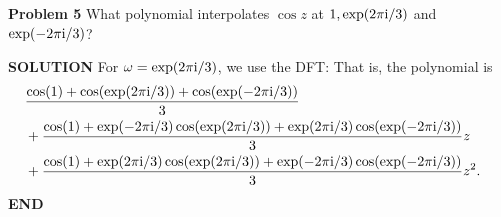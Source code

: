 \documentclass[12pt,a4paper]{article}
\begin{document}
\textbf{Problem 5} What polynomial interpolates $\cos z$ at $1, \exp(2\pi{\rm i}/3)$ and $\exp(-2\pi{\rm i}/3)$?

\textbf{SOLUTION} For $\omega =  \exp(2\pi{\rm i}/3)$, we use the DFT:
That is, the polynomial is
\begin{align*}
&{\cos(1) + \cos(\exp(2\pi{\rm i}/3))+ \cos(\exp(-2\pi{\rm i}/3)) \over 3}  \cr
&+ {\cos(1)+ \exp(-2\pi{\rm i}/3) \cos(\exp(2\pi{\rm i}/3))+ \exp(2\pi{\rm i}/3) \cos(\exp(-2\pi{\rm i}/3))\over 3} z \cr
&+{\cos(1)+ \exp(2\pi{\rm i}/3) \cos(\exp(2\pi{\rm i}/3))+ \exp(-2\pi{\rm i}/3) \cos(\exp(-2\pi{\rm i}/3)) \over 3} z^2.
\end{align*}
\textbf{END}
\end{document}
